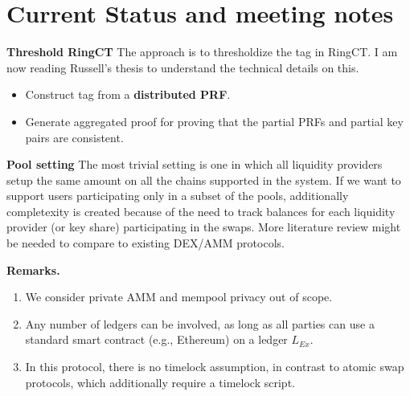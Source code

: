 \section*{Current Status and meeting notes}

\noindent \textbf{{Threshold RingCT}} The approach is to thresholdize the tag in RingCT. I am now reading Russell's thesis to understand the technical details on this.
\begin{itemize}
    \item Construct tag from a \textbf{distributed PRF}.
    \item Generate aggregated proof for proving that the partial PRFs and partial key pairs are consistent.
   \end{itemize}
\noindent \textbf{{Pool setting}}
    The most trivial setting is one in which all liquidity providers setup the same amount on all the chains supported in the system. If we want to support users participating only in a subset of the pools, additionally completexity is created because of the need to track balances for each liquidity provider (or key share) participating in the swaps. 
    More literature review might be needed to compare to existing DEX/AMM protocols.

\noindent \textbf{Remarks.}
\begin{enumerate}
    \item {We consider private AMM and mempool privacy out of scope.}
    \item Any number of ledgers can be involved, as long as all parties can use a standard smart contract (e.g., Ethereum) on a ledger $L_{Ex}$.
    \item In this protocol, there is no timelock assumption, in contrast to atomic swap protocols, which additionally require a timelock script.
\end{enumerate}
